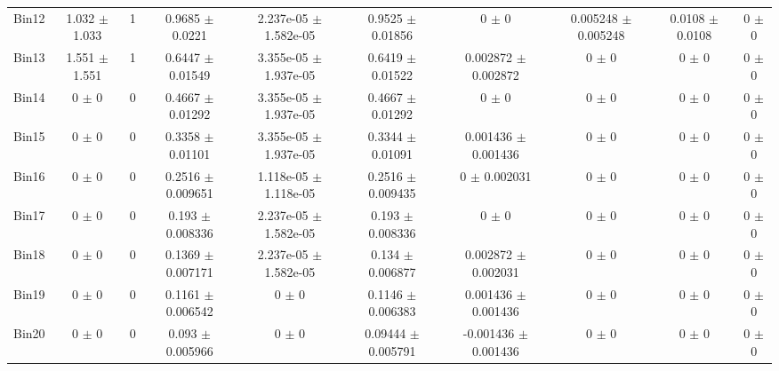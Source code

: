 \begin{tabular}{@{\extracolsep{4pt}}lccccccccc@{}}
     Bin12 & 1.032 $\pm$ 1.033 & 1 & 0.9685 $\pm$ 0.0221 & 2.237e-05 $\pm$ 1.582e-05 & 0.9525 $\pm$ 0.01856 & 0 $\pm$ 0 & 0.005248 $\pm$ 0.005248 & 0.0108 $\pm$ 0.0108 & 0 $\pm$ 0 \\ 
     Bin13 & 1.551 $\pm$ 1.551 & 1 & 0.6447 $\pm$ 0.01549 & 3.355e-05 $\pm$ 1.937e-05 & 0.6419 $\pm$ 0.01522 & 0.002872 $\pm$ 0.002872 & 0 $\pm$ 0 & 0 $\pm$ 0 & 0 $\pm$ 0 \\ 
     Bin14 & 0 $\pm$ 0 & 0 & 0.4667 $\pm$ 0.01292 & 3.355e-05 $\pm$ 1.937e-05 & 0.4667 $\pm$ 0.01292 & 0 $\pm$ 0 & 0 $\pm$ 0 & 0 $\pm$ 0 & 0 $\pm$ 0 \\ 
     Bin15 & 0 $\pm$ 0 & 0 & 0.3358 $\pm$ 0.01101 & 3.355e-05 $\pm$ 1.937e-05 & 0.3344 $\pm$ 0.01091 & 0.001436 $\pm$ 0.001436 & 0 $\pm$ 0 & 0 $\pm$ 0 & 0 $\pm$ 0 \\ 
     Bin16 & 0 $\pm$ 0 & 0 & 0.2516 $\pm$ 0.009651 & 1.118e-05 $\pm$ 1.118e-05 & 0.2516 $\pm$ 0.009435 & 0 $\pm$ 0.002031 & 0 $\pm$ 0 & 0 $\pm$ 0 & 0 $\pm$ 0 \\ 
     Bin17 & 0 $\pm$ 0 & 0 & 0.193 $\pm$ 0.008336 & 2.237e-05 $\pm$ 1.582e-05 & 0.193 $\pm$ 0.008336 & 0 $\pm$ 0 & 0 $\pm$ 0 & 0 $\pm$ 0 & 0 $\pm$ 0 \\ 
     Bin18 & 0 $\pm$ 0 & 0 & 0.1369 $\pm$ 0.007171 & 2.237e-05 $\pm$ 1.582e-05 & 0.134 $\pm$ 0.006877 & 0.002872 $\pm$ 0.002031 & 0 $\pm$ 0 & 0 $\pm$ 0 & 0 $\pm$ 0 \\ 
     Bin19 & 0 $\pm$ 0 & 0 & 0.1161 $\pm$ 0.006542 & 0 $\pm$ 0 & 0.1146 $\pm$ 0.006383 & 0.001436 $\pm$ 0.001436 & 0 $\pm$ 0 & 0 $\pm$ 0 & 0 $\pm$ 0 \\ 
     Bin20 & 0 $\pm$ 0 & 0 & 0.093 $\pm$ 0.005966 & 0 $\pm$ 0 & 0.09444 $\pm$ 0.005791 & -0.001436 $\pm$ 0.001436 & 0 $\pm$ 0 & 0 $\pm$ 0 & 0 $\pm$ 0 \\ 
\hline\hline
  \end{tabular}
